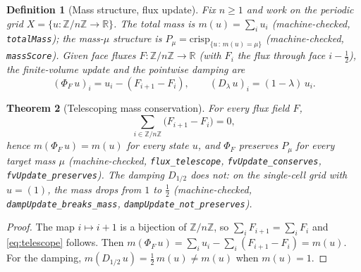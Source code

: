 \documentclass[11pt,a4paper]{article}
\newtheorem{theorem}{Theorem}[section]
\newtheorem{definition}[theorem]{Definition}
\newcommand{\Real}{\mathbb{R}}
\begin{document}
\begin{definition}[Mass structure, flux update]
\label{def:fv}
Fix $n \ge 1$ and work on the periodic grid
$X = \{u : \mathbb{Z}/n\mathbb{Z} \to \Real\}$.
The \emph{total mass} is $m(u) = \sum_{i} u_i$
(machine-checked, \texttt{totalMass}); the mass-$\mu$ structure is
$P_\mu = \mathrm{crisp}_{\{u \,:\, m(u) = \mu\}}$
(machine-checked, \texttt{massScore}).
Given face fluxes $F : \mathbb{Z}/n\mathbb{Z} \to \Real$ (with $F_i$
the flux through face $i - \tfrac{1}{2}$), the \emph{finite-volume
update} and the pointwise damping are
\[
  (\Phi_F\,u)_i = u_i - (F_{i+1} - F_i),
  \qquad
  (D_\lambda\,u)_i = (1 - \lambda)\,u_i .
\]
\end{definition}

\begin{theorem}[Telescoping mass conservation]
\label{thm:fv}
For every flux field $F$,
\begin{equation}
\label{eq:telescope}
  \sum_{i \in \mathbb{Z}/n\mathbb{Z}} \bigl(F_{i+1} - F_i\bigr) = 0,
\end{equation}
hence $m(\Phi_F\,u) = m(u)$ for every state $u$, and $\Phi_F$
preserves $P_\mu$ for every target mass $\mu$
(machine-checked, \texttt{flux\_telescope},
\texttt{fvUpdate\_conserves}, \texttt{fvUpdate\_preserves}).
The damping $D_{1/2}$ does not: on the single-cell grid with $u = (1)$,
the mass drops from $1$ to $\tfrac{1}{2}$
(machine-checked, \texttt{dampUpdate\_breaks\_mass},
\texttt{dampUpdate\_not\_preserves}).
\end{theorem}
\begin{proof}
The map $i \mapsto i + 1$ is a bijection of
$\mathbb{Z}/n\mathbb{Z}$, so
$\sum_i F_{i+1} = \sum_i F_i$ and \cref{eq:telescope} follows.
Then
$m(\Phi_F\,u) = \sum_i u_i - \sum_i (F_{i+1} - F_i) = m(u)$.
For the damping, $m(D_{1/2}\,u) = \tfrac{1}{2}\,m(u) \neq m(u)$ when
$m(u) = 1$.
\end{proof}
\end{document}
